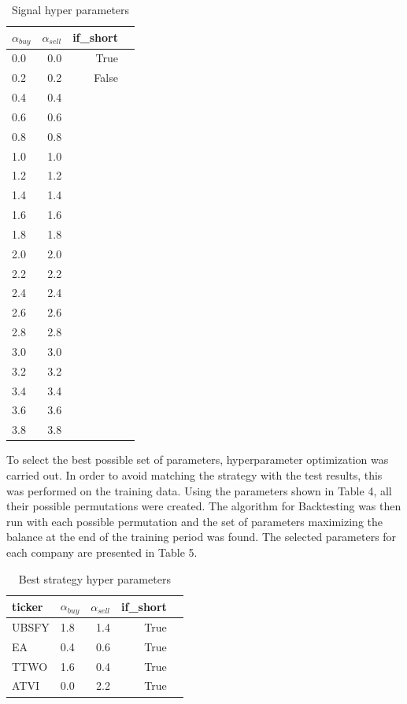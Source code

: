 \documentclass[11pt]{article} %
\begin{document}
\begin{table}[H]
\centering
\caption{Signal hyper parameters}
\begin{tabular}{lrrl}
\toprule
  $\alpha_{buy}$ &  $\alpha_{sell}$  & if\_short \\
\midrule
        0.0 &           0.0 &     True \\
         0.2 &           0.2 &    False \\
         0.4 &           0.4  \\
         0.6 &           0.6  \\
          0.8 &           0.8  \\
          1.0 &           1.0  \\
          1.2 &           1.2  \\
          1.4 &           1.4  \\
          1.6 &           1.6  \\
          1.8 &           1.8  \\
         2.0 &           2.0  \\
          2.2 &           2.2  \\
          2.4 &           2.4  \\
          2.6 &           2.6  \\
          2.8 &           2.8  \\
          3.0 &           3.0  \\
          3.2 &           3.2  \\
          3.4 &           3.4  \\
          3.6 &           3.6  \\
          3.8 &           3.8  \\
\bottomrule
\end{tabular}
\end{table}

To select the best possible set of parameters, hyperparameter optimization was carried out. In order to avoid matching the strategy with the test results, this was performed on the training data. Using the parameters shown in Table 4, all their possible permutations were created. The algorithm for Backtesting was then run with each possible permutation and the set of parameters maximizing the balance at the end of the training period was found. The selected parameters for each company are presented in Table 5. 

\begin{table}[H]
\centering
\caption{Best strategy hyper parameters}
\begin{tabular}{llrrl}
\toprule
 ticker &  $\alpha_{buy}$ &  $\alpha_{sell}$  &  if\_short \\
\midrule
  UBSFY &          1.8 &           1.4 &      True \\
     EA &          0.4 &           0.6 &      True \\
   TTWO &          1.6 &           0.4 &      True \\
   ATVI &          0.0 &           2.2 &      True \\
\bottomrule
\end{tabular}
\end{table}
\end{document}
